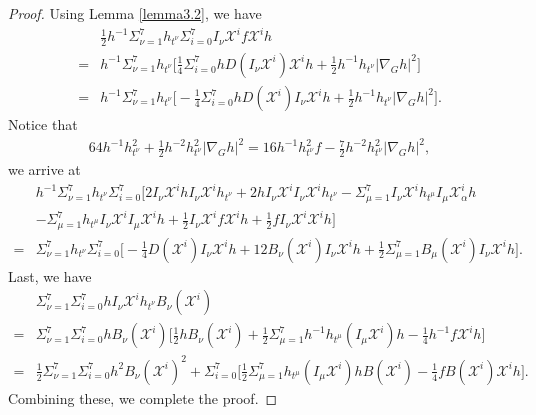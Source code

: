 \documentclass[10pt,a4paper]{amsart}
\numberwithin{equation}{section}
\begin{document}
\begin{proof}
    Using Lemma \ref{lemma3.2}, we have
\begin{align*}
   & \frac{1}{2}h^{-1}\Sigma_{\nu=1}^7h_{t^\nu}\Sigma_{i=0}^7I_\nu\mathscr{X}^i f\mathscr{X}^i h\\=&h^{-1}\Sigma_{\nu=1}^7h_{t^\nu}\bigg[\frac{1}{4}\Sigma_{i=0}^7hD(I_\nu\mathscr{X}^i)\mathscr{X}^i h +\frac{1}{2}h^{-1}h_{t^\nu}|\nabla_G h|^2\bigg]\\=&h^{-1}\Sigma_{\nu=1}^7h_{t^\nu}\bigg[-\frac{1}{4}\Sigma_{i=0}^7hD(\mathscr{X}^i)I_\nu\mathscr{X}^i h +\frac{1}{2}h^{-1}h_{t^\nu}|\nabla_G h|^2\bigg].\end{align*}
   Notice that
\begin{align*}
    64h^{-1}h^2_{t^\nu}+\frac{1}{2}h^{-2}h^2_{t^\nu}|\nabla_G h|^2=16h^{-1}h^2_{t^\nu}f-\frac{7}{2}h^{-2}h^2_{t^\nu}|\nabla_G h|^2,
    \end{align*}
we arrive at
\begin{align*}
   &h^{-1}\Sigma_{\nu=1}^7h_{t^\nu}\Sigma_{i=0}^7\bigg[2I_\nu\mathscr{X}^i h I_\nu\mathscr{X}^i h_{t^\nu}+2h I_\nu\mathscr{X}^i I_\nu\mathscr{X}^i h_{t^\nu}-\Sigma_{\mu=1}^7I_\nu\mathscr{X}^i h_{t^\mu}I_\mu\mathscr{X}^i_\alpha h\\&-\Sigma_{\mu=1}^7h_{t^\mu}I_\nu\mathscr{X}^i I_\mu\mathscr{X}^i h+\frac{1}{2}I_\nu\mathscr{X}^i f\mathscr{X}^i h+\frac{1}{2}fI_\nu\mathscr{X}^i\mathscr{X}^i h\bigg]\\=&\Sigma_{\nu=1}^7h_{t^\nu}\Sigma_{i=0}^7\bigg[-\frac{1}{4}D(\mathscr{X}^i )I_\nu\mathscr{X}^i h+12B_\nu(\mathscr{X}^i)I_\nu\mathscr{X}^ih+\frac{1}{2}\Sigma_{\mu=1}^7B_\mu(\mathscr{X}^i)I_\nu\mathscr{X}^i h\bigg].
    \end{align*}
Last, we have
\begin{align*}
    &\Sigma_{\nu=1}^7\Sigma_{i=0}^7hI_\nu\mathscr{X}^i h_{t^\nu}B_\nu(\mathscr{X}^i)\\=&\Sigma_{\nu=1}^7\Sigma_{i=0}^7hB_\nu(\mathscr{X}^i)\bigg[\frac{1}{2}hB_\nu(\mathscr{X}^i)+\frac{1}{2}\Sigma_{\mu=1}^7h^{-1}h_{t^\mu}(I_\mu\mathscr{X}^i)h-\frac{1}{4}h^{-1}f\mathscr{X}^i h\bigg]\\=&\frac{1}{2}\Sigma_{\nu=1}^7\Sigma_{i=0}^7h^2B_\nu(\mathscr{X}^i)^2+\Sigma_{i=0}^7\bigg[\frac{1}{2}\Sigma_{\mu=1}^7h_{t^\mu}(I_\mu\mathscr{X}^i)h B(\mathscr{X}^i)-\frac{1}{4}fB(\mathscr{X}^i )\mathscr{X}^i h\bigg].
\end{align*}
Combining these, we complete the proof.
\end{proof}
\end{document}
